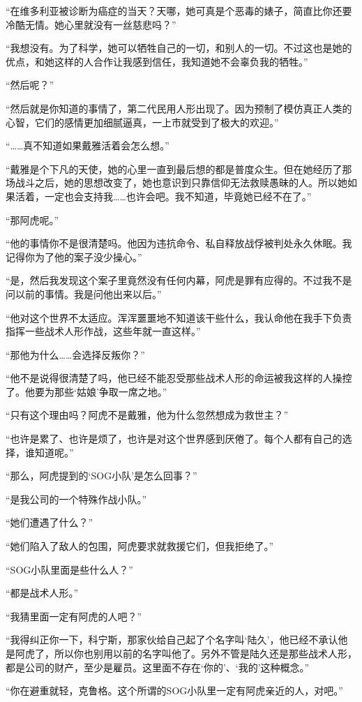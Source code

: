 “在维多利亚被诊断为癌症的当天？天哪，她可真是个恶毒的婊子，简直比你还要冷酷无情。她心里就没有一丝慈悲吗？”

“我想没有。为了科学，她可以牺牲自己的一切，和别人的一切。不过这也是她的优点，和她这样的人合作让我感到信任，我知道她不会辜负我的牺牲。”

“然后呢？”

“然后就是你知道的事情了，第二代民用人形出现了。因为预制了模仿真正人类的心智，它们的感情更加细腻逼真，一上市就受到了极大的欢迎。”

“……真不知道如果戴雅活着会怎么想。”

“戴雅是个下凡的天使，她的心里一直到最后想的都是普度众生。但在她经历了那场战斗之后，她的思想改变了，她也意识到只靠信仰无法救赎愚昧的人。所以她如果活着，一定也会支持我……也许会吧。我不知道，毕竟她已经不在了。”

“那阿虎呢。”

“他的事情你不是很清楚吗。他因为违抗命令、私自释放战俘被判处永久休眠。我记得你为了他的案子没少操心。”

“是，然后我发现这个案子里竟然没有任何内幕，阿虎是罪有应得的。不过我不是问以前的事情。我是问他出来以后。”

“他对这个世界不太适应。浑浑噩噩地不知道该干些什么，我认命他在我手下负责指挥一些战术人形作战，这些年就一直这样。”

“那他为什么……会选择反叛你？”

“他不是说得很清楚了吗，他已经不能忍受那些战术人形的命运被我这样的人操控了。他要为那些‘姑娘’争取一席之地。”

“只有这个理由吗？阿虎不是戴雅，他为什么忽然想成为救世主？”

“也许是累了、也许是烦了，也许是对这个世界感到厌倦了。每个人都有自己的选择，谁知道呢。”

“那么，阿虎提到的‘SOG小队’是怎么回事？”

“是我公司的一个特殊作战小队。”

“她们遭遇了什么？”

“她们陷入了敌人的包围，阿虎要求就救援它们，但我拒绝了。”

“SOG小队里面是些什么人？”

“都是战术人形。”

“我猜里面一定有阿虎的人吧？”

“我得纠正你一下，科宁斯，那家伙给自己起了个名字叫‘陆久’，他已经不承认他是阿虎了，所以你也别用以前的名字叫他了。另外不管是陆久还是那些战术人形，都是公司的财产，至少是雇员。这里面不存在‘你的’、‘我的’这种概念。”

“你在避重就轻，克鲁格。这个所谓的SOG小队里一定有阿虎亲近的人，对吧。”

